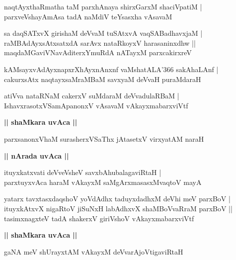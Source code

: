 \documentclass[twoside,12pt,openright]{book}
\newcounter{shloka}[chapter]
\def\uvaca#1{\centerline{{\large\textbf{#1}}}}
\begin{document}
\begin{shloka}%
naqtAyxthaRmatha taM parxhAnaya shirxGarxM shaciVpatiM |\\
parxveVshayAmAsa tadA naMdiV teYsasxha vAsavaM 
\end{shloka}

\begin{shloka}%
sa daqSATxvX girishaM deVvaM tuSAtxvA vaqSABadhavxjaM |\\
raMBAdAyxsAtxsatxdA sarAvx nataRkoyxV harasaninxdhw ||\\
maqdaMGaviVNavAditerxYmuRdA nATayxM parxcakirxreV 
\end{shloka}

\begin{shloka}%
kAMsayxvAdAyxnapxrXhAyxnAnxnf vaMshatALA\char'366 sakAhaLAnf |\\
cakurxsAtx naqtayxsaMraMBaM savxyaM deVvaH puraMdaraH 
\end{shloka}

\begin{shloka}%
atiVva nataRNaM cakerxV suMdaraM deVvadulaRBaM |\\
IshavxrasotxVSamApanonxV vAsavaM vAkayxmabarxviVtf 
\end{shloka}

\uvaca{|| shaMkara uvAca ||}

\begin{shloka}%
parxsanonxVhaM surasherxVSaThx jAtasetxV virxyatAM naraH 
\end{shloka}

\uvaca{|| nArada uvAca ||}

\begin{shloka}%
ituyxkatxvati deVveVsheV savxbAhubalagaviRtaH |\\
parxtuyxvAca haraM vAkayxM saMgArxmasasxMvaqtoV mayA 
\end{shloka}

\begin{shloka}%
yatarx tavxtasxdaqshoV yoVdAdhx taduyxdadhxM deVhi meV parxBoV |\\
ituyxkAtxvX nigaRtoV jiSuNxH labAdhxvX shaMBoVvaRraM parxBoV ||\\
tasimxnagxteV tadA shakerxV giriVshoV vAkayxmabarxviVtf
\end{shloka}

\uvaca{|| shaMkara uvAca ||}

\begin{shloka}%
gaNA meV shUrayxtAM vAkayxM deVvarAjoVtigaviRtaH 
\end{shloka}
\end{document}
